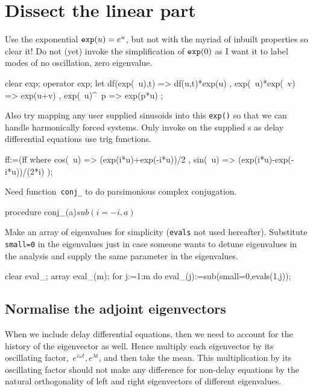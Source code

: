 \documentclass[11pt,a5paper]{article}
\begin{document}
\section{Dissect the linear part}

Use the exponential $\verb|exp|(u)=e^{u}$, but not with the
myriad of inbuilt properties so clear it! Do not (yet)
invoke the simplification of $\verb|exp|(0)$ as I want it to
label modes of no oscillation, zero eigenvalue.
\begin{reduce}
clear exp; operator exp;
let { df(exp(~u),t) => df(u,t)*exp(u)
    , exp(~u)*exp(~v) => exp(u+v)
    , exp(~u)^~p => exp(p*u)
    };
\end{reduce}
Also try mapping any user supplied sinusoids into 
this \verb|exp()| so that we can handle harmonically 
forced systems.  Only invoke on the supplied \ode{}s as 
delay differential equations use trig functions.
\begin{reduce}
ff:=(ff where { cos(~u) => (exp(i*u)+exp(-i*u))/2
              , sin(~u) => (exp(i*u)-exp(-i*u))/(2*i) 
              } );
\end{reduce}


Need function~\verb|conj_| to do parsimonious complex
conjugation.   
\begin{reduce}
procedure conj_(a)$ sub(i=-i,a)$
\end{reduce}

Make an array of eigenvalues for simplicity (\verb|evals|
not used hereafter).  Substitute \verb|small=0| in the
eigenvalues just in case someone wants to detune eigenvalues
in the analysis and supply the same parameter in the
eigenvalues.
\begin{reduce}
clear eval_;  array eval_(m);
for j:=1:m do eval_(j):=sub(small=0,evals(1,j));
\end{reduce}



\subsection{Normalise the adjoint eigenvectors}
When we include delay differential equations, then we need
to account for the history of the eigenvector as well. Hence
multiply each eigenvector by its oscillating
factor,~\(e^{i\omega t}, e^{\lambda t}\), and then take the
mean. This multiplication by its oscillating factor should
not make any difference for non-delay equations by the
natural orthogonality of left and right eigenvectors of
different eigenvalues. 
\end{document}

